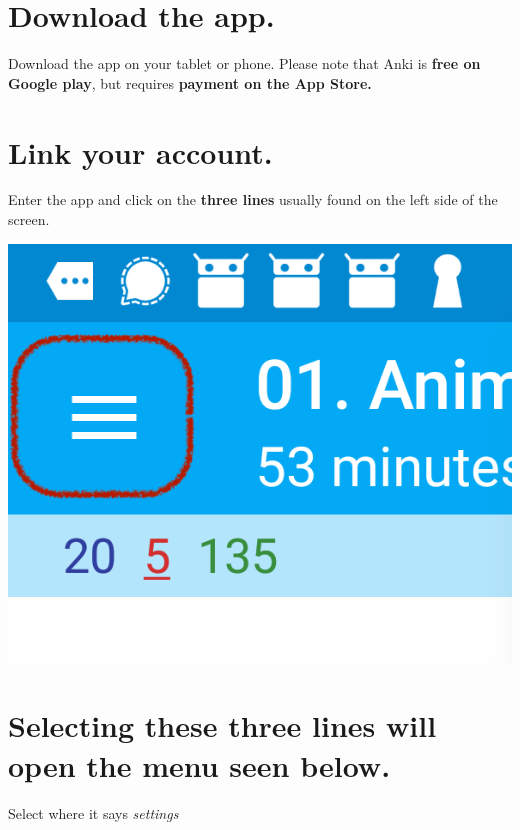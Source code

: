 \documentclass[
]{book}
\begin{document}
\hypertarget{download-the-app.}{%
\section{Download the app.}\label{download-the-app.}}

Download the app on your tablet or phone. Please note that Anki is \textbf{free on Google play}, but requires \textbf{payment on the App Store.}

\hypertarget{link-your-account.}{%
\section{Link your account.}\label{link-your-account.}}

Enter the app and click on the \textbf{three lines} usually found on the left side of the screen.

\includegraphics[width=0.5\linewidth]{images/reposit_en/tres_lineas}

\hypertarget{selecting-these-three-lines-will-open-the-menu-seen-below.}{%
\section{Selecting these three lines will open the menu seen below.}\label{selecting-these-three-lines-will-open-the-menu-seen-below.}}

Select where it says \emph{settings}
\end{document}
